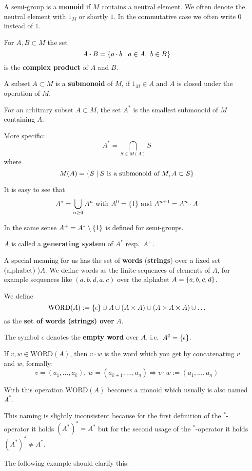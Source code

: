 A semi-group is a {\bf monoid} if $M$ contains a neutral element. We often
denote the neutral element with $1_M$ or shortly $1$. In the commutative case we
often write $0$ instead of $1$.

For $A,B \subset M$ the set
\[ A \cdot B = \mbox{$\{a \cdot b \mid a \in A,\ b \in B\}$} \]
is the {\bf complex product} of $A$ and $B$.

A subset $A \subset M$ is a {\bf submonoid} of $M$, if $1_M \in A$ and $A$ is
closed under the operation of $M$.

For an arbitrary subset $A \subset M$, the set $A^*$ is the smallest submonoid
of $M$ containing $A$.

More specific:
\[ A^* = \bigcap_{S \in M(A)} S	\]
where 
\[ M(A) = \mbox{$\{S \mid S\text{ is a submonoid of }M, A \subset S\}$} \]

It is easy to see that
\[ A^* = \bigcup_{n \geq 0} A^n\text{ with }A^0 = \mbox{$\{1\}$}\text{ and } A^{n+1}=
A^n \cdot A \]

In the same sense $A^+ = A^* \setminus \mbox{$\{1\}$}$ is defined for semi-groups.

$A$ is called a {\bf generating system} of $A^*$ resp.\ $A^+$.

A special meaning for us has the set of {\bf words} ({\bf strings}) over
a fixed set (alphabet) )$A$. We define words as the finite sequences
of elements of $A$, for example sequences like $(a,b,d,a,c)$ over the alphabet
$A = \mbox{$\{a,b,c,d \}$}$.

We define
\[ \mathrm{WORD}(A) := \mbox{$\{\epsilon\}$} \cup A \cup (A \times A) \cup (A \times
A \times A) \cup \ldots \]
as the {\bf set of words (strings) over} $A$. 

The symbol $\epsilon$ denotes the {\bf empty word} over $A$, i.e.\ $A^0 =
\mbox{$\{\epsilon\}$}$.

If $v, w \in \mathrm{WORD}(A)$, then $v \cdot w$ is the word which you get by
concatenating $v$ and $w$, formally:
\[ v = (a_1, \ldots, a_k),\ w = (a_{k+1}, \ldots, a_n) \Rightarrow v \cdot
w := (a_1, \ldots, a_n) \]

With this operation $\mathrm{WORD}(A)$ becomes a monoid which usually is also
named $A^*$.

This naming is slightly inconsistent because for the first definition of
the ${}^*$-operator it holds $(A^*)^* = A^*$ but for the second usage of the
${}^*$-operator it holds $(A^*)^* \neq A^*$.

\medskip
The following example should clarify this:

